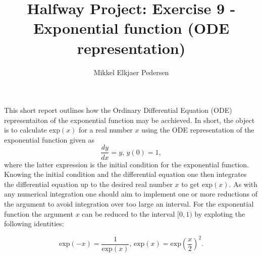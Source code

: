 \documentclass[onecolumn]{article}
\begin{document}
\title{Halfway Project: Exercise 9 - Exponential function (ODE representation)}
\date{}
\author{Mikkel Elkjaer Pedersen}
\maketitle

This short report outlines how the Ordinary Differential Equation (ODE) representaiton of the exponential function may be acchieved.
In short, the object is to calculate $\mathrm{exp}(x)$ for a real number $x$ using the ODE representation of the exponential function given as
\begin{equation}
\frac{dy}{dx} = y, \, y(0) = 1,
\end{equation}
where the latter expression is the initial condition for the exponential function. Knowing the initial condition and the differential equation one
then integrates the differential equation up to the desired real number $x$ to get $\mathrm{exp}(x)$. As with any numerical integration one 
should aim to implement one or more reductions of the argument to avoid integration over too large an interval. For the exponential function the
argument $x$ can be reduced to the interval $[0,1)$ by exploting the following identities:

\begin{equation}
\mathrm{exp}(-x) = \frac{1}{\mathrm{exp}(x)}, \, \mathrm{exp}(x) = \mathrm{exp}\left( \frac{x}{2}\right) ^2.
\label{eqn:reduction}
\end{equation}
\end{document}
